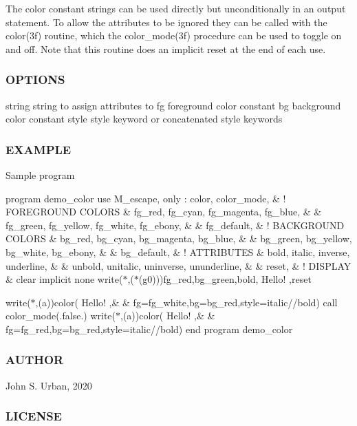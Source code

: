The color constant strings can be used directly but unconditionally in an output statement. To allow the attributes to be ignored they can be called with the color(3f) routine, which the color\+\_\+mode(3f) procedure can be used to toggle on and off. Note that this routine does an implicit reset at the end of each use.

\subsubsection*{O\+P\+T\+I\+O\+NS}

string string to assign attributes to fg foreground color constant bg background color constant style style keyword or concatenated style keywords

\subsubsection*{E\+X\+A\+M\+P\+LE}

Sample program

program demo\+\_\+color use M\+\_\+escape, only \+: color, color\+\_\+mode, \& ! F\+O\+R\+E\+G\+R\+O\+U\+ND C\+O\+L\+O\+RS \& fg\+\_\+red, fg\+\_\+cyan, fg\+\_\+magenta, fg\+\_\+blue, \& \& fg\+\_\+green, fg\+\_\+yellow, fg\+\_\+white, fg\+\_\+ebony, \& \& fg\+\_\+default, \& ! B\+A\+C\+K\+G\+R\+O\+U\+ND C\+O\+L\+O\+RS \& bg\+\_\+red, bg\+\_\+cyan, bg\+\_\+magenta, bg\+\_\+blue, \& \& bg\+\_\+green, bg\+\_\+yellow, bg\+\_\+white, bg\+\_\+ebony, \& \& bg\+\_\+default, \& ! A\+T\+T\+R\+I\+B\+U\+T\+ES \& bold, italic, inverse, underline, \& \& unbold, unitalic, uninverse, ununderline, \& \& reset, \& ! D\+I\+S\+P\+L\+AY \& clear implicit none write($\ast$,\textquotesingle{}($\ast$(g0))\textquotesingle{})fg\+\_\+red,bg\+\_\+green,bold,\textquotesingle{} Hello! \textquotesingle{},reset

write($\ast$,\textquotesingle{}(a)\textquotesingle{})color(\textquotesingle{} Hello! \textquotesingle{},\& \& fg=fg\+\_\+white,bg=bg\+\_\+red,style=italic//bold) call color\+\_\+mode(.false.) write($\ast$,\textquotesingle{}(a)\textquotesingle{})color(\textquotesingle{} Hello! \textquotesingle{},\& \& fg=fg\+\_\+red,bg=bg\+\_\+red,style=italic//bold) end program demo\+\_\+color

\subsubsection*{A\+U\+T\+H\+OR}

John S. Urban, 2020 \subsubsection*{L\+I\+C\+E\+N\+SE}

